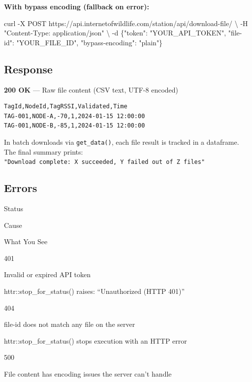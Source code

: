 \documentclass[
]{book}
\newenvironment{Shaded}{\begin{snugshade}}{\end{snugshade}}
\newcommand{\AttributeTok}[1]{\textcolor[rgb]{0.13,0.29,0.53}{#1}}
\newcommand{\DataTypeTok}[1]{\textcolor[rgb]{0.13,0.29,0.53}{#1}}
\newcommand{\ExtensionTok}[1]{#1}
\newcommand{\NormalTok}[1]{#1}
\newcommand{\StringTok}[1]{\textcolor[rgb]{0.31,0.60,0.02}{#1}}
\begin{document}
\textbf{With bypass encoding (fallback on error):}

\begin{Shaded}
\begin{Highlighting}[]
\ExtensionTok{curl} \AttributeTok{{-}X}\NormalTok{ POST https://api.internetofwildlife.com/station/api/download{-}file/ }\DataTypeTok{\textbackslash{}}
  \AttributeTok{{-}H} \StringTok{"Content{-}Type: application/json"} \DataTypeTok{\textbackslash{}}
  \AttributeTok{{-}d} \StringTok{\textquotesingle{}\{"token": "YOUR\_API\_TOKEN", "file{-}id": "YOUR\_FILE\_ID", "bypass{-}encoding": "plain"\}\textquotesingle{}}
\end{Highlighting}
\end{Shaded}

\subsection{Response}\label{response-3}

\textbf{200 OK} --- Raw file content (CSV text, UTF-8 encoded)

\begin{verbatim}
TagId,NodeId,TagRSSI,Validated,Time
TAG-001,NODE-A,-70,1,2024-01-15 12:00:00
TAG-001,NODE-B,-85,1,2024-01-15 12:00:00
\end{verbatim}

In batch downloads via \texttt{get\_data()}, each file result is tracked in a dataframe. The final summary prints: \texttt{"Download\ complete:\ X\ succeeded,\ Y\ failed\ out\ of\ Z\ files"}

\subsection{Errors}\label{errors-3}

Status

Cause

What You See

{401}

Invalid or expired API token

httr::stop\_for\_status() raises: ``Unauthorized (HTTP 401)''

{404}

file-id does not match any file on the server

httr::stop\_for\_status() stops execution with an HTTP error

{500}

File content has encoding issues the server can't handle
\end{document}
